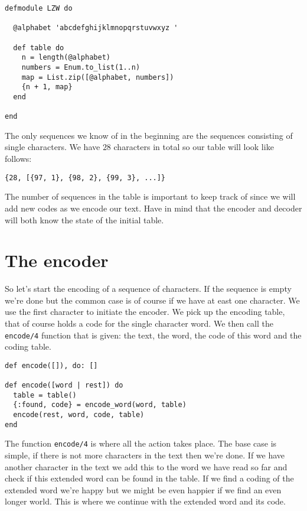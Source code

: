 \documentclass[a4paper,11pt]{article}
\begin{document}
\begin{verbatim}
defmodule LZW do

  @alphabet 'abcdefghijklmnopqrstuvwxyz '
  
  def table do
    n = length(@alphabet)
    numbers = Enum.to_list(1..n)
    map = List.zip([@alphabet, numbers])
    {n + 1, map}
  end
  
end
\end{verbatim}

The only sequences we know of in the beginning are the sequences
consisting of single characters. We have $28$ characters in total so
our table will look like follows:

\begin{verbatim}
{28, [{97, 1}, {98, 2}, {99, 3}, ...]}
\end{verbatim}

The number of sequences in the table is important to keep track of
since we will add new codes as we encode our text. Have in mind that
the encoder and decoder will both know the state of the initial table.



\section{The encoder}

So let's start the encoding of a sequence of characters. If the
sequence is empty we're done but the common case is of course if we
have at east one character. We use the first character to initiate the
encoder. We pick up the encoding table, that of course holds a code
for the single character word. We then call the {\tt encode/4}
function that is given: the text, the word, the code of this word and
the coding table.

\begin{verbatim}
def encode([]), do: []

def encode([word | rest]) do
  table = table()
  {:found, code} = encode_word(word, table)
  encode(rest, word, code, table)
end
\end{verbatim}

The function {\tt encode/4} is where all the action takes place. The
base case is simple, if there is not more characters in the text then
we're done. If we have another character in the text we add this to the
word we have read so far and check if this extended word can be found
in the table. If we find a coding of the extended word we're happy but we
might be even happier if we find an even longer world. This is
where we continue with the extended word and its code.
\end{document}
